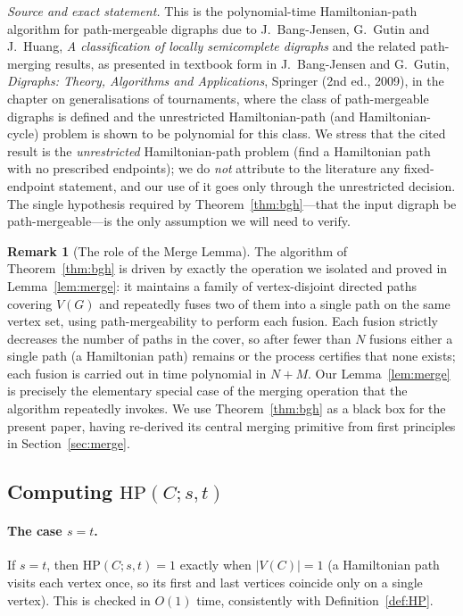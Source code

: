 \documentclass[12pt]{article}
\theoremstyle{definition}
\newtheorem{remark}{Remark}
\begin{document}
\noindent\emph{Source and exact statement.} This is the polynomial-time
Hamiltonian-path algorithm for path-mergeable digraphs due to J.~Bang-Jensen,
G.~Gutin and J.~Huang, \emph{A classification of locally semicomplete digraphs}
and the related path-merging results, as presented in textbook form in
J.~Bang-Jensen and G.~Gutin, \emph{Digraphs: Theory, Algorithms and
Applications}, Springer (2nd ed., 2009), in the chapter on generalisations of
tournaments, where the class of path-mergeable digraphs is defined and the
unrestricted Hamiltonian-path (and Hamiltonian-cycle) problem is shown to be
polynomial for this class. We stress that the cited result is the
\emph{unrestricted} Hamiltonian-path problem (find a Hamiltonian path with no
prescribed endpoints); we do \emph{not} attribute to the literature any
fixed-endpoint statement, and our use of it goes only through the unrestricted
decision. The single hypothesis required by Theorem~\ref{thm:bgh}---that the input
digraph be path-mergeable---is the only assumption we will need to verify.

\begin{remark}[The role of the Merge Lemma]\label{rem:engine}
The algorithm of Theorem~\ref{thm:bgh} is driven by exactly the operation we
isolated and proved in Lemma~\ref{lem:merge}: it maintains a family of
vertex-disjoint directed paths covering $V(G)$ and repeatedly fuses two of them
into a single path on the same vertex set, using path-mergeability to perform each
fusion. Each fusion strictly decreases the number of paths in the cover, so after
fewer than $N$ fusions either a single path (a Hamiltonian path) remains or the
process certifies that none exists; each fusion is carried out in time polynomial
in $N+M$. Our Lemma~\ref{lem:merge} is precisely the elementary special case of
the merging operation that the algorithm repeatedly invokes. We use
Theorem~\ref{thm:bgh} as a black box for the present paper, having re-derived its
central merging primitive from first principles in Section~\ref{sec:merge}.
\end{remark}

\subsection{Computing \texorpdfstring{$\mathrm{HP}(C;s,t)$}{HP(C;s,t)}}

\paragraph{The case $s=t$.}
If $s=t$, then $\mathrm{HP}(C;s,t)=1$ exactly when $|V(C)|=1$ (a Hamiltonian path
visits each vertex once, so its first and last vertices coincide only on a single
vertex). This is checked in $O(1)$ time, consistently with
Definition~\ref{def:HP}.
\end{document}
